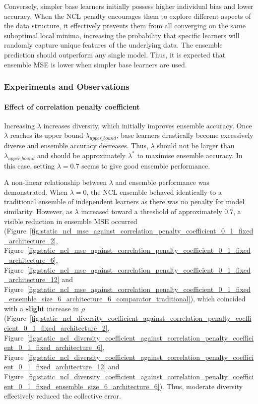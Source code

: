 Conversely, simpler base learners initially possess higher individual bias and lower accuracy. When the NCL penalty encourages them to explore different aspects of the data structure, it effectively prevents them from all converging on the same suboptimal local minima, increasing the probability that specific learners will randomly capture unique features of the underlying data. The ensemble prediction should outperform any single model. Thus, it is expected that ensemble MSE is lower when simpler base learners are used. 


\subsubsection{Experiments and Observations}
\label{subsubsec:evaluation_ncl_observations}
\paragraph{Effect of correlation penalty coefficient}
Increasing $\lambda$ increases diversity, which initially improves ensemble accuracy. Once $\lambda$ reaches its upper bound $\lambda_{upper\_bound}$, base learners drastically become excessively diverse and ensemble accuracy decreases. Thus, $\lambda$ should not be larger than $\lambda_{upper\_bound}$ and should be approximately $\lambda^*$ to maximise ensemble accuracy. In this case, setting $\lambda = 0.7$ seems to give good ensemble performance. 

A non-linear relationship between $\lambda$ and ensemble performance was demonstrated. When $\lambda = 0$, the NCL ensemble behaved identically to a traditional ensemble of independent learners as there was no penalty for model similarity. However, as $\lambda$ increased toward a threshold of approximately $0.7$, a visible reduction in ensemble MSE occurred (Figure~\ref{fig:static_ncl_mse_against_correlation_penalty_coefficient_0_1_fixed_architecture_2}, Figure~\ref{fig:static_ncl_mse_against_correlation_penalty_coefficient_0_1_fixed_architecture_6}, Figure~\ref{fig:static_ncl_mse_against_correlation_penalty_coefficient_0_1_fixed_architecture_12} and Figure~\ref{fig:static_ncl_mse_against_correlation_penalty_coefficient_0_1_fixed_ensemble_size_6_architecture_6_comparator_traditional}), which coincided with a \textbf{slight} increase in $\rho$ (Figure~\ref{fig:static_ncl_diversity_coefficient_against_correlation_penalty_coefficient_0_1_fixed_architecture_2}, Figure~\ref{fig:static_ncl_diversity_coefficient_against_correlation_penalty_coefficient_0_1_fixed_architecture_6}, Figure~\ref{fig:static_ncl_diversity_coefficient_against_correlation_penalty_coefficient_0_1_fixed_architecture_12} and Figure~\ref{fig:static_ncl_diversity_coefficient_against_correlation_penalty_coefficient_0_1_fixed_ensemble_size_6_architecture_6}). Thus, moderate diversity effectively reduced the collective error. 

